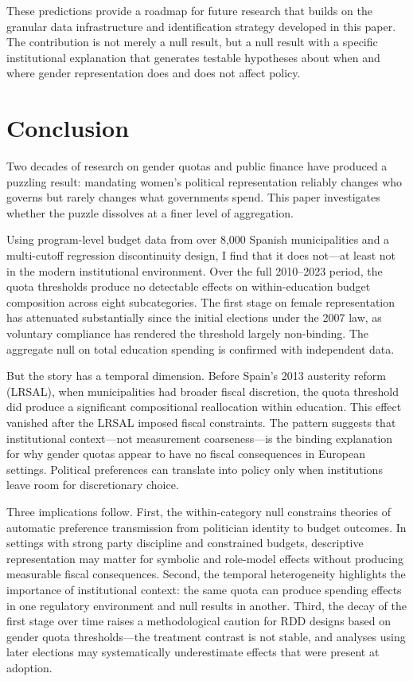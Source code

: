 \documentclass[12pt]{article}
\begin{document}
These predictions provide a roadmap for future research that builds on the granular data infrastructure and identification strategy developed in this paper. The contribution is not merely a null result, but a null result with a specific institutional explanation that generates testable hypotheses about when and where gender representation does and does not affect policy.


\section{Conclusion}

Two decades of research on gender quotas and public finance have produced a puzzling result: mandating women's political representation reliably changes who governs but rarely changes what governments spend. This paper investigates whether the puzzle dissolves at a finer level of aggregation.

Using program-level budget data from over 8,000 Spanish municipalities and a multi-cutoff regression discontinuity design, I find that it does not---at least not in the modern institutional environment. Over the full 2010--2023 period, the quota thresholds produce no detectable effects on within-education budget composition across eight subcategories. The first stage on female representation has attenuated substantially since the initial elections under the 2007 law, as voluntary compliance has rendered the threshold largely non-binding. The aggregate null on total education spending is confirmed with independent data.

But the story has a temporal dimension. Before Spain's 2013 austerity reform (LRSAL), when municipalities had broader fiscal discretion, the quota threshold did produce a significant compositional reallocation within education. This effect vanished after the LRSAL imposed fiscal constraints. The pattern suggests that institutional context---not measurement coarseness---is the binding explanation for why gender quotas appear to have no fiscal consequences in European settings. Political preferences can translate into policy only when institutions leave room for discretionary choice.

Three implications follow. First, the within-category null constrains theories of automatic preference transmission from politician identity to budget outcomes. In settings with strong party discipline and constrained budgets, descriptive representation may matter for symbolic and role-model effects without producing measurable fiscal consequences. Second, the temporal heterogeneity highlights the importance of institutional context: the same quota can produce spending effects in one regulatory environment and null results in another. Third, the decay of the first stage over time raises a methodological caution for RDD designs based on gender quota thresholds---the treatment contrast is not stable, and analyses using later elections may systematically underestimate effects that were present at adoption.
\end{document}
